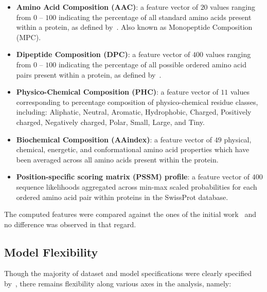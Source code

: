 \begin{itemize}
\item \textbf{Amino Acid Composition (AAC)}: a feature vector of $20$ values ranging from $0$ -- $100$ indicating the
percentage of all standard amino acids present within a protein, as defined by~\cite{gromiha2010protein}. Also known
as Monopeptide Composition (MPC).
\item \textbf{Dipeptide Composition (DPC)}: a feature vector of $400$ values ranging from $0$ -- $100$ indicating the
percentage of all possible ordered amino acid pairs present within a protein, as defined by~\cite{gromiha2010protein}.
\item \textbf{Physico-Chemical Composition (PHC)}: a feature vector of $11$ values corresponding
to percentage composition of physico-chemical residue classes, including: Aliphatic, Neutral, Aromatic, Hydrophobic, Charged, Positively charged,
Negatively charged, Polar, Small, Large, and Tiny. 
\item \textbf{Biochemical Composition (AAindex)}: a feature vector of $49$ physical, chemical, energetic, and
conformational amino acid properties which have been averaged across all amino acids present within the protein.
\item \textbf{Position-specific scoring matrix (PSSM) profile}: a feature vector of $400$ sequence
likelihoods aggregated across min-max scaled probabilities for each ordered amino acid pair within
proteins in the SwissProt database.
\end{itemize}

{The computed features were compared against the ones of the initial work~\cite{mishra2014prediction} and no difference was 
observed in that regard.}
\subsection{Model Flexibility}
\label{sec:modelflex}
Though the majority of dataset and model specifications were clearly specified by~\cite{mishra2014prediction}, there
remains flexibility along various axes in the analysis, namely:

